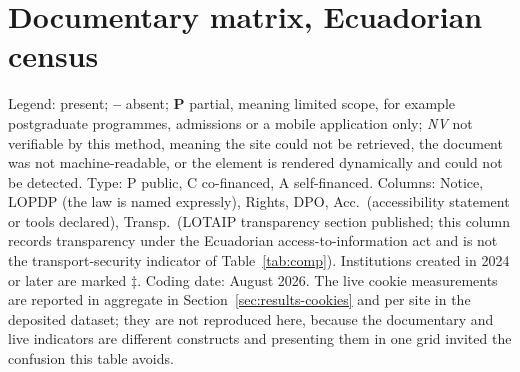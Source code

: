 \documentclass[]{interact}
\newcommand{\si}{\ding{51}}
\newcommand{\no}{\textcolor{gris}{\textbf{--}}}
\newcommand{\nv}{\textsl{\footnotesize NV}}
\begin{document}
\section{Documentary matrix, Ecuadorian census}\label{ap:ecuador}
\setcounter{table}{0}\setcounter{figure}{0}

Legend: \si{} present; \no{} absent; \textbf{P} partial, meaning limited scope, for example postgraduate programmes, admissions or a mobile application only; \nv{} not verifiable by this method, meaning the site could not be retrieved, the document was not machine-readable, or the element is rendered dynamically and could not be detected. Type: P public, C co-financed, A self-financed. Columns: Notice, LOPDP (the law is named expressly), Rights, DPO, Acc.\ (accessibility statement or tools declared), Transp.\ (LOTAIP transparency section published; this column records transparency under the Ecuadorian access-to-information act and is not the transport-security indicator of Table~\ref{tab:comp}). Institutions created in 2024 or later are marked $\ddagger$. Coding date: August 2026. The live cookie measurements are reported in aggregate in Section~\ref{sec:results-cookies} and per site in the deposited dataset; they are not reproduced here, because the documentary and live indicators are different constructs and presenting them in one grid invited the confusion this table avoids.
\end{document}
